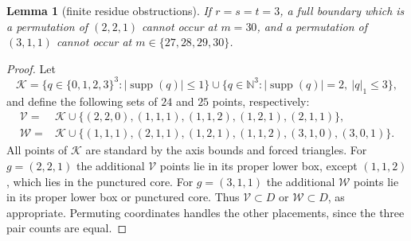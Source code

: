 \documentclass[11pt]{article}
\newtheorem{lemma}[theorem]{Lemma}
\theoremstyle{definition}
\theoremstyle{remark}
\theoremstyle{plain}
\begin{document}
\begin{lemma}[finite residue obstructions]\label{res:A3.8}
If $r=s=t=3$, a full boundary which is a permutation of $(2,2,1)$
cannot occur at $m=30$, and a permutation of $(3,1,1)$ cannot occur at
$m\in\{27,28,29,30\}$.
\end{lemma}
\begin{proof}
Let
\[
 \mathcal K=\{q\in\{0,1,2,3\}^3:|\operatorname{supp}(q)|\le1\}
 \cup\{q\in\mathbb N^3:|\operatorname{supp}(q)|=2,\ |q|_1\le3\},
\]
and define the following sets of $24$ and $25$ points, respectively:
\[
\begin{aligned}
 \mathcal V={}&\mathcal K\cup\{(2,2,0),(1,1,1),(1,1,2),(1,2,1),(2,1,1)\},\\
 \mathcal W={}&\mathcal K\cup\{(1,1,1),(2,1,1),(1,2,1),(1,1,2),(3,1,0),(3,0,1)\}.
\end{aligned}
\]
All points of $\mathcal K$ are standard by the axis bounds and forced triangles.
For $g=(2,2,1)$ the additional $\mathcal V$ points lie in its proper lower box,
except $(1,1,2)$, which lies in the punctured core.  For $g=(3,1,1)$
the additional $\mathcal W$ points lie in its proper lower box or punctured core.
Thus $\mathcal V\subset D$ or $\mathcal W\subset D$, as appropriate.  Permuting coordinates
handles the other placements, since the three pair counts are equal.


\end{proof}
\end{document}
